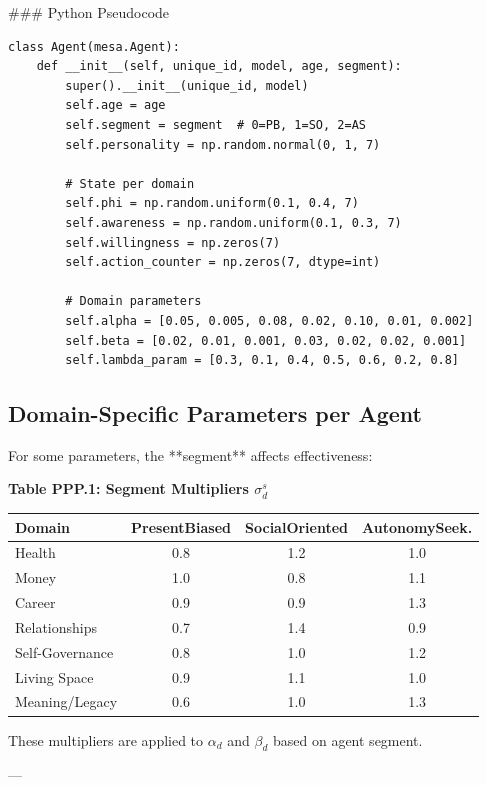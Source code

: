 ### Python Pseudocode

\begin{verbatim}
class Agent(mesa.Agent):
    def __init__(self, unique_id, model, age, segment):
        super().__init__(unique_id, model)
        self.age = age
        self.segment = segment  # 0=PB, 1=SO, 2=AS
        self.personality = np.random.normal(0, 1, 7)

        # State per domain
        self.phi = np.random.uniform(0.1, 0.4, 7)
        self.awareness = np.random.uniform(0.1, 0.3, 7)
        self.willingness = np.zeros(7)
        self.action_counter = np.zeros(7, dtype=int)

        # Domain parameters
        self.alpha = [0.05, 0.005, 0.08, 0.02, 0.10, 0.01, 0.002]
        self.beta = [0.02, 0.01, 0.001, 0.03, 0.02, 0.02, 0.001]
        self.lambda_param = [0.3, 0.1, 0.4, 0.5, 0.6, 0.2, 0.8]
\end{verbatim}

\subsection{Domain-Specific Parameters per Agent}

For some parameters, the **segment** affects effectiveness:

\textbf{Table PPP.1: Segment Multipliers $\sigma_d^s$}

\begin{center}
\small
\begin{tabular}{@{}lccc@{}}
\toprule
\textbf{Domain} & \textbf{PresentBiased} & \textbf{SocialOriented} & \textbf{AutonomySeek.} \\
\midrule
Health & 0.8 & 1.2 & 1.0 \\
Money & 1.0 & 0.8 & 1.1 \\
Career & 0.9 & 0.9 & 1.3 \\
Relationships & 0.7 & 1.4 & 0.9 \\
Self-Governance & 0.8 & 1.0 & 1.2 \\
Living Space & 0.9 & 1.1 & 1.0 \\
Meaning/Legacy & 0.6 & 1.0 & 1.3 \\
\midrule
\end{tabular}
\end{center}

These multipliers are applied to $\alpha_d$ and $\beta_d$ based on agent segment.

---


